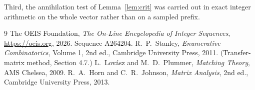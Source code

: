 \documentclass[11pt,a4paper]{article}
\theoremstyle{plain}
\theoremstyle{definition}
\begin{document}
Third, the annihilation test of Lemma~\ref{lem:crit} was carried out in exact integer
arithmetic on the whole vector rather than on a sampled prefix.

\begin{thebibliography}{9}
 The OEIS Foundation, \emph{The On-Line Encyclopedia of Integer
Sequences}, \url{https://oeis.org}, 2026. Sequence A264204.
 R.~P.~Stanley, \emph{Enumerative Combinatorics}, Volume 1, 2nd ed.,
Cambridge University Press, 2011. (Transfer-matrix method, Section 4.7.)
 L.~Lov\'asz and M.~D.~Plummer, \emph{Matching Theory}, AMS Chelsea, 2009.
 R.~A.~Horn and C.~R.~Johnson, \emph{Matrix Analysis}, 2nd ed., Cambridge
University Press, 2013.
\end{thebibliography}
\end{document}
